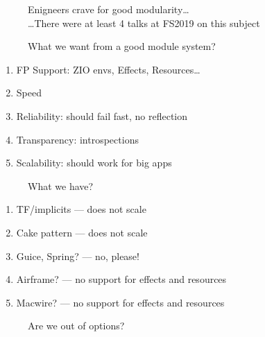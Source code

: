 \documentclass[usenames,dvipsnames,aspectratio=169]{beamer}
\begin{document}
\begin{frame}
  \begin{figure}
  \Huge Enigneers crave for good modularity\dots \\
  \large \dots There were at least 4 talks at FS2019 on this subject
  \end{figure}
\end{frame}

\begin{frame}
  \begin{figure}
  \Huge What we want from a good module system?
  \end{figure}

  \begin{enumerate}
  \item FP Support: ZIO envs, Effects, Resources\dots
  \item Speed
  \item Reliability: should fail fast, no reflection
  \item Transparency: introspections
  \item Scalability: should work for big apps
  \end{enumerate}
\end{frame}

\begin{frame}
  \begin{figure}
  \Huge What we have?
  \end{figure}

  \begin{enumerate}
  \item TF/implicits --- does not scale
  \item Cake pattern --- does not scale
  \item Guice, Spring? --- no, please!
  \item Airframe? --- no support for effects and resources
  \item Macwire? --- no support for effects and resources
  \end{enumerate}
\end{frame}

\begin{frame}
  \begin{figure}
  \Huge Are we out of options?
  \end{figure}
\end{frame}
\end{document}

